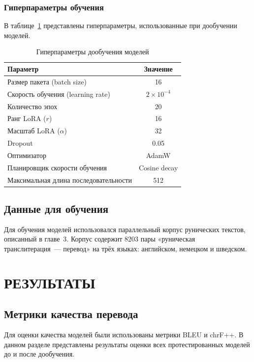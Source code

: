 \documentclass[14pt,a4paper]{extreport}
\begin{document}
\subsection{Гиперпараметры обучения}

В таблице~\ref{tab:training_params} представлены гиперпараметры, использованные при дообучении моделей.

\begin{table}[H]
\centering
\caption{Гиперпараметры дообучения моделей}
\label{tab:training_params}
\begin{tabular}{|l|c|}
\hline
\textbf{Параметр} & \textbf{Значение} \\
\hline
Размер пакета (batch size) & 16 \\
\hline
Скорость обучения (learning rate) & $2 \times 10^{-4}$ \\
\hline
Количество эпох & 20 \\
\hline
Ранг LoRA ($r$) & 16 \\
\hline
Масштаб LoRA ($\alpha$) & 32 \\
\hline
Dropout & 0.05 \\
\hline
Оптимизатор & AdamW \\
\hline
Планировщик скорости обучения & Cosine decay \\
\hline
Максимальная длина последовательности & 512 \\
\hline
\end{tabular}
\end{table}

\section{Данные для обучения}

Для обучения моделей использовался параллельный корпус рунических текстов, описанный в главе~3. Корпус содержит 8203 пары «руническая транслитерация~--- перевод» на трёх языках: английском, немецком и шведском.

\chapter{РЕЗУЛЬТАТЫ}
\section{Метрики качества перевода}

Для оценки качества моделей были использованы метрики BLEU и chrF++. В данном разделе представлены результаты оценки всех протестированных моделей до и после дообучения.
\end{document}
